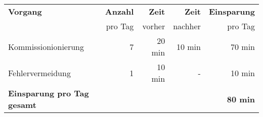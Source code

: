 \begin{tabular}{lrrrr}
    \rowcolor{heading}\textbf{Vorgang} & \textbf{Anzahl} & \textbf{Zeit} & \textbf{Zeit} & \textbf{Einsparung}\\
    \rowcolor{heading} & pro Tag & vorher & nachher & pro Tag\\
    Kommissionionierung & 7 & 20 \mbox{min} & 10 \mbox{min} & 70 \mbox{min} \\
    \rowcolor{odd}Fehlervermeidung & 1 & 10 \mbox{min} & - & 10 \mbox{min} \\
    \hline
    \hline
    \rowcolor{heading}\textbf{Einsparung pro Tag gesamt} & \textbf{} & \textbf{} & \textbf{} & \textbf{80 \mbox{min}} \\

    \end{tabular}
